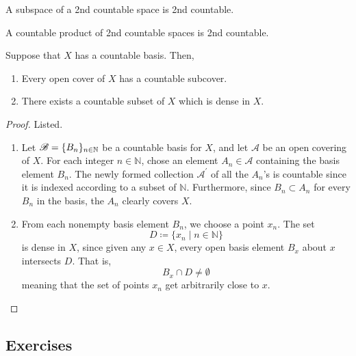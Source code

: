   \begin{theorem}[Subspace]
    \label{thm:subspace-2}
    A subspace of a 2nd countable space is 2nd countable. 
  \end{theorem}

  \begin{theorem}
    \label{thm:finite-products-3}
    
  \end{theorem}

  \begin{theorem}
    \label{thm:countable-products-2}
    A countable product of 2nd countable spaces is 2nd countable. 
  \end{theorem}

  \begin{theorem}
    \label{thm:lindelof-and-separability-from-a-countable-basis}
    Suppose that $X$ has a countable basis. Then, 
    \begin{enumerate}
      \item Every open cover of $X$ has a countable subcover. 
      \item There exists a countable subset of $X$ which is dense in $X$. 
    \end{enumerate}
  \end{theorem}
  \begin{proof}
    Listed. 
    \begin{enumerate}
      \item Let $\operatorname{\mathscr{B}} = \{B_n\}_{n \in \mathbb{N}}$ be a countable basis for $X$, and let $\mathscr{A}$ be an open covering of $X$. For each integer $n \in \mathbb{N}$, chose an element $A_n \in \mathscr{A}$ containing the basis element $B_n$. The newly formed collection $\mathscr{A}^\prime$ of all the $A_n$'s is countable since it is indexed according to a subset of $\mathbb{N}$. Furthermore, since $B_n \subset A_n$ for every $B_n$ in the basis, the $A_n$ clearly covers $X$. 

      \item From each nonempty basis element $B_n$, we choose a point $x_n$. The set 
      \begin{equation}
        D \coloneqq \{x_n \mid n \in \mathbb{N}\}
      \end{equation}
      is dense in $X$, since given any $x \in X$, every open basis element $B_x$ about $x$ intersects $D$. That is, 
      \begin{equation}
        B_x \cap D \neq \emptyset
      \end{equation}
      meaning that the set of points $x_n$ get arbitrarily close to $x$. 
    \end{enumerate}
  \end{proof}

\subsection{Exercises}
